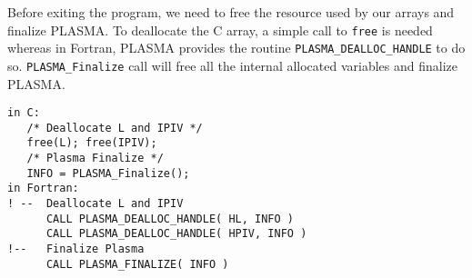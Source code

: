 Before exiting the program, we need to free the resource used by
our arrays and finalize PLASMA.
To deallocate the C array, a simple call to \texttt{free} is needed 
whereas in Fortran, PLASMA provides the 
routine \texttt{PLASMA\_DEALLOC\_HANDLE} to do so.
\texttt{PLASMA\_Finalize} call will free all the internal allocated variables and finalize PLASMA.
\begin{verbatim}
in C:
   /* Deallocate L and IPIV */
   free(L); free(IPIV);
   /* Plasma Finalize */
   INFO = PLASMA_Finalize();
in Fortran:
! --  Deallocate L and IPIV
      CALL PLASMA_DEALLOC_HANDLE( HL, INFO )
      CALL PLASMA_DEALLOC_HANDLE( HPIV, INFO )
!--   Finalize Plasma
      CALL PLASMA_FINALIZE( INFO )
\end{verbatim}



